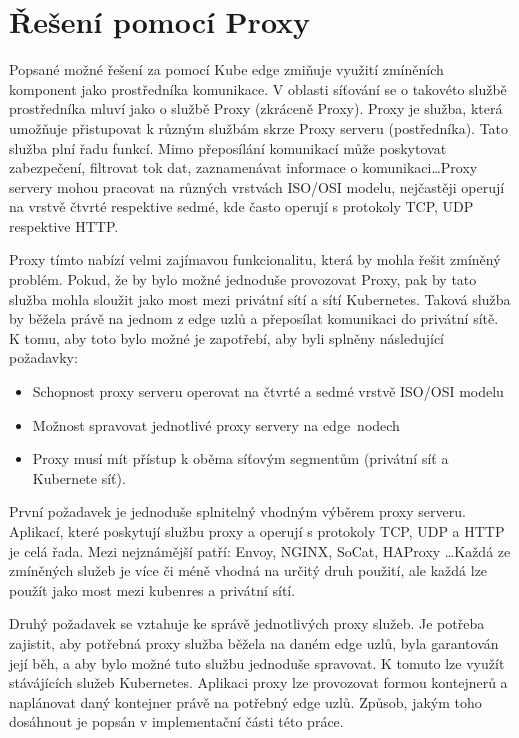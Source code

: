\section{Řešení pomocí Proxy}\label{sec:req}
Popsané možné řešení za pomocí Kube edge zmiňuje využití zmíněních komponent jako prostředníka komunikace. V oblasti síťování se o takovéto službě prostředníka mluví jako o službě Proxy (zkráceně Proxy). Proxy je služba, která umožňuje přistupovat k různým službám skrze Proxy serveru (postředníka). Tato služba plní řadu funkcí. Mimo přeposílání komunikací může poskytovat zabezpečení, filtrovat tok dat, zaznamenávat informace o komunikaci\ldots Proxy servery mohou pracovat na různých vrstvách ISO/OSI modelu, nejčastěji operují na vrstvě čtvrté respektive sedmé, kde často operují s protokoly TCP, UDP respektive HTTP.

Proxy tímto nabízí velmi zajímavou funkcionalitu, která by mohla řešit zmíněný problém. Pokud, že by bylo možné jednoduše provozovat Proxy, pak by tato služba mohla sloužit jako most mezi privátní sítí a sítí Kubernetes. Taková služba by běžela právě na jednom z edge uzlů a přeposílat komunikaci do privátní sítě. K tomu, aby toto bylo možné je zapotřebí, aby byli splněny následující požadavky:

\begin{itemize}
    \item Schopnost proxy serveru operovat na čtvrté a sedmé vrstvě ISO/OSI modelu
    \item Možnost spravovat jednotlivé proxy servery na edge~nodech
    \item Proxy musí mít přístup k oběma síťovým segmentům (privátní síť a Kubernete síť).
\end{itemize}

První požadavek je jednoduše splnitelný vhodným výběrem proxy serveru. Aplikací, které poskytují službu proxy a operují s protokoly TCP, UDP a HTTP je celá řada. Mezi nejznámější patří: Envoy, NGINX, SoCat, HAProxy \ldots Každá ze zmíněných služeb je více či méně vhodná na určitý druh použití, ale každá lze použít jako most mezi kubenres a privátní sítí.

Druhý požadavek se vztahuje ke správě jednotlivých proxy služeb. Je potřeba zajistit, aby potřebná proxy služba běžela na daném edge uzlů, byla garantován její běh, a aby bylo možné tuto službu jednoduše spravovat. K tomuto lze využít stávájících služeb Kubernetes. Aplikaci proxy lze provozovat formou kontejnerů a naplánovat daný kontejner právě na potřebný edge uzlů. Způsob, jakým toho dosáhnout je popsán v implementační části této práce.  

